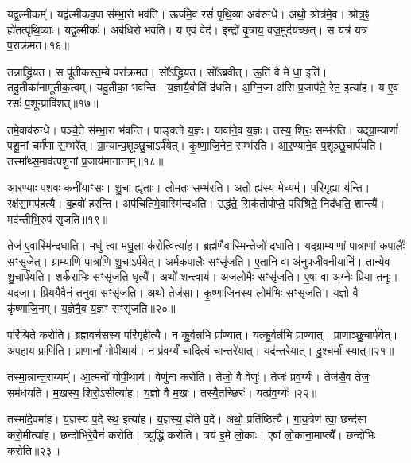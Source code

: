 यद्व॒ल्मीकम्᳚। 
यद्व॑ल्मीकव॒पा स॑म्भा॒रो भव॑ति। 
ऊर्ज॑मे॒व रसं॑ पृथि॒व्या अव॑रुन्धे। 
अथो॒ श्रोत्र॑मे॒व। 
श्रोत्र॒ꣴ॒ ह्ये॑तत्पृ॑थि॒व्याः। 
यद्व॒ल्मीकः॑। 
अब॑धिरो भवति। 
य ए॒वं वेद॑। 
इन्द्रो॑ वृ॒त्राय॒ वज्र॒मुद॑यच्छत्। 
स यत्र॑ यत्र प॒राक्र॑मत॥१६॥

तन्नाद्ध्रि॑यत। 
स पू॑तीकस्त॒म्बे परा᳚क्रमत। 
सो᳚ऽद्ध्रियत। 
सो᳚ऽब्रवीत्। 
ऊ॒तिं वै मे॑ धा॒ इति॑। 
तदू॒तीका॑नामूतीक॒त्वम्। 
यदू॒तीका॒ भव॑न्ति। 
य॒ज्ञायै॒वोतिं द॑धति। 
अ॒ग्नि॒जा अ॑सि प्र॒जाप॑ते॒ रेत॒ इत्या॑ह। 
य ए॒व रसः॑ प॒शून्प्रावि॑शत्॥१७॥

तमे॒वाव॑रुन्धे। 
पञ्चै॒ते स॑म्भा॒रा भ॑वन्ति। 
पाङ्क्तो॑ य॒ज्ञः। 
यावा॑ने॒व य॒ज्ञः। 
तस्य॒ शिरः॒ सम्भ॑रति। 
यद्ग्रा॒म्याणां᳚ पशू॒नां चर्म॑णा स॒म्भरे᳚त्। 
ग्रा॒म्यान्प॒शूञ्छु॒चाऽर्प॑येत्। 
कृ॒ष्णा॒जि॒नेन॒ सम्भ॑रति। 
आ॒र॒ण्याने॒व प॒शूञ्छु॒चार्प॑यति। 
तस्मा᳚थ्स॒माव॑त्पशू॒नां प्र॒जाय॑मानानाम्॥१८॥

आ॒र॒ण्याः प॒शवः॒ कनी॑याꣳसः। 
शु॒चा ह्यृ॑ताः। 
लो॒म॒तः सम्भ॑रति। 
अतो॒ ह्य॑स्य॒ मेध्यम्᳚। 
प॒रि॒गृह्या य॑न्ति। 
रक्ष॑सा॒मप॑हत्यै। 
ब॒हवो॑ हरन्ति। 
अप॑चितिमे॒वास्मि॑न्दधति। 
उद्ध॑ते॒ सिक॑तोपोप्ते॒ परि॑श्रिते॒ निद॑धति॒ शान्त्यै᳚। 
मद॑न्तीभि॒रुप॑ सृजति॥१९॥

तेज॑ ए॒वास्मि॑न्दधाति। 
मधु॑ त्वा मधु॒ला क॑रो॒त्वित्या॑ह। 
ब्रह्म॑णै॒वास्मि॒न्तेजो॑ दधाति। 
यद्ग्रा॒म्याणां॒ पात्रा॑णां क॒पालैः᳚ सꣳसृ॒जेत्। 
ग्रा॒म्याणि॒ पात्रा॑णि शु॒चाऽर्प॑येत्। 
अ॒र्म॒क॒पा॒लैः सꣳसृ॑जति। 
ए॒तानि॒ वा अ॑नुपजीवनी॒यानि॑। 
तान्ये॒व शु॒चार्प॑यति। 
शर्क॑राभिः॒ सꣳसृ॑जति॒ धृत्यै᳚। 
अथो॑ श॒न्त्वाय॑। 
अ॒ज॒लो॒मैः सꣳसृ॑जति। 
ए॒षा वा अ॒ग्नेः प्रि॒या त॒नूः। 
यद॒जा। 
प्रि॒ययै॒वैनं॑ त॒नुवा॒ सꣳसृ॑जति। 
अथो॒ तेज॑सा। 
कृ॒ष्णा॒जि॒नस्य॒ लोम॑भिः॒ सꣳसृ॑जति। 
य॒ज्ञो वै कृ॑ष्णाजि॒नम्। 
य॒ज्ञेनै॒व य॒ज्ञꣳ सꣳसृ॑जति॥२०॥
\anuvakamend[या॒ज्या॑यै॒ न जु॑हु॒यादवि॑श॒द्वेणुः॒ शान्त्यै॑ प॒ङ्क्तिरा॑धस॒मित्या॑ह हरति दिहन्ति प॒राक्र॑म॒तावि॑शत् प्र॒जाय॑मानानाꣳ सृजति श॒न्त्वाया॒ष्टौ च॑]

परि॑श्रिते करोति। 
ब्र॒ह्म॒व॒र्च॒सस्य॒ परि॑गृहीत्यै। 
न कु॒र्वन्न॒भि प्रा᳚ण्यात्। 
यत्कु॒र्वन्न॑भि प्रा॒ण्यात्। 
प्रा॒णाञ्छु॒चार्प॑येत्। 
अ॒प॒हाय॒ प्राणि॑ति। 
प्रा॒णानां᳚ गोपी॒थाय॑। 
न प्र॑व॒र्ग्यं॑ चादि॒त्यं चा॒न्तरे॑यात्। 
यद॑न्तरे॒यात्। 
दु॒श्चर्मा᳚ स्यात्॥२१॥

तस्मा॒न्नान्त॒राय्यम्᳚। 
आ॒त्मनो॑ गोपी॒थाय॑। 
वेणु॑ना करोति। 
तेजो॒ वै वेणुः॑। 
तेजः॑ प्रव॒र्ग्यः॑। 
तेज॑सै॒व तेजः॒ सम॑र्धयति। 
म॒खस्य॒ शिरो॒ऽसीत्या॑ह। 
य॒ज्ञो वै म॒खः। 
तस्यै॒तच्छिरः॑। 
यत्प्र॑व॒र्ग्यः॑॥२२॥

तस्मा॑दे॒वमा॑ह। 
य॒ज्ञस्य॑ प॒दे स्थ॒ इत्या॑ह। 
य॒ज्ञस्य॒ ह्ये॑ते प॒दे। 
अथो॒ प्रति॑ष्ठित्यै। 
गा॒य॒त्रेण॑ त्वा॒ छन्द॑सा करो॒मीत्या॑ह। 
छन्दो॑भिरे॒वैनं॑ करोति। 
त्र्यु॑द्धिं करोति। 
त्रय॑ इ॒मे लो॒काः। 
ए॒षां लो॒काना॒माप्त्यै᳚। 
छन्दो॑भिः करोति॥२३॥

